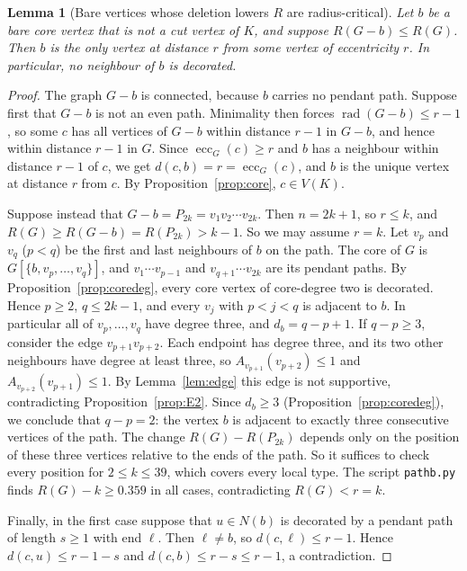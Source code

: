 \documentclass[11pt,a4paper]{article}
\newtheorem{lemma}[theorem]{Lemma}
\theoremstyle{definition}
\newcommand{\rad}{\operatorname{rad}}
\newcommand{\ecc}{\operatorname{ecc}}
\begin{document}
\begin{lemma}[Bare vertices whose deletion lowers $R$ are radius-critical]\label{lem:Xcrit}
Let $b$ be a bare core vertex that is not a cut vertex of $K$, and suppose $R(G-b)\le R(G)$. Then $b$ is the only vertex at distance $r$ from some vertex of eccentricity $r$. In particular, no neighbour of $b$ is decorated.
\end{lemma}
\begin{proof}
The graph $G-b$ is connected, because $b$ carries no pendant path. Suppose first that $G-b$ is not an even path. Minimality then forces $\rad(G-b)\le r-1$, so some $c$ has all vertices of $G-b$ within distance $r-1$ in $G-b$, and hence within distance $r-1$ in $G$. Since $\ecc_G(c)\ge r$ and $b$ has a neighbour within distance $r-1$ of $c$, we get $d(c,b)=r=\ecc_G(c)$, and $b$ is the unique vertex at distance $r$ from $c$. By Proposition~\ref{prop:core}, $c\in V(K)$.

Suppose instead that $G-b=P_{2k}=v_1v_2\cdots v_{2k}$. Then $n=2k+1$, so $r\le k$, and $R(G)\ge R(G-b)=R(P_{2k})>k-1$. So we may assume $r=k$. Let $v_p$ and $v_q$ ($p<q$) be the first and last neighbours of $b$ on the path. The core of $G$ is $G[\{b,v_p,\dots,v_q\}]$, and $v_1\cdots v_{p-1}$ and $v_{q+1}\cdots v_{2k}$ are its pendant paths. By Proposition~\ref{prop:coredeg}, every core vertex of core-degree two is decorated. Hence $p\ge2$, $q\le2k-1$, and every $v_j$ with $p<j<q$ is adjacent to $b$. In particular all of $v_p,\dots,v_q$ have degree three, and $d_b=q-p+1$. If $q-p\ge3$, consider the edge $v_{p+1}v_{p+2}$. Each endpoint has degree three, and its two other neighbours have degree at least three, so $A_{v_{p+1}}(v_{p+2})\le1$ and $A_{v_{p+2}}(v_{p+1})\le1$. By Lemma~\ref{lem:edge} this edge is not supportive, contradicting Proposition~\ref{prop:E2}. Since $d_b\ge3$ (Proposition~\ref{prop:coredeg}), we conclude that $q-p=2$: the vertex $b$ is adjacent to exactly three consecutive vertices of the path. The change $R(G)-R(P_{2k})$ depends only on the position of these three vertices relative to the ends of the path. So it suffices to check every position for $2\le k\le39$, which covers every local type. The script \texttt{pathb.py} finds $R(G)-k\ge0.359$ in all cases, contradicting $R(G)<r=k$.

Finally, in the first case suppose that $u\in N(b)$ is decorated by a pendant path of length $s\ge1$ with end $\ell$. Then $\ell\ne b$, so $d(c,\ell)\le r-1$. Hence $d(c,u)\le r-1-s$ and $d(c,b)\le r-s\le r-1$, a contradiction.
\end{proof}
\end{document}
